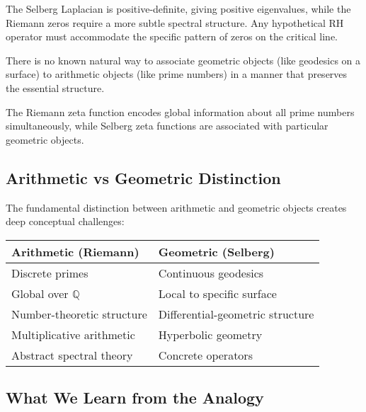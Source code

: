 \begin{problem}
\label{prob:sign_problem}
The Selberg Laplacian is positive-definite, giving positive eigenvalues, while the Riemann zeros require a more subtle spectral structure. Any hypothetical RH operator must accommodate the specific pattern of zeros on the critical line.
\end{problem}

\begin{problem}
\label{prob:arithmetic_geometric}
There is no known natural way to associate geometric objects (like geodesics on a surface) to arithmetic objects (like prime numbers) in a manner that preserves the essential structure.
\end{problem}

\begin{problem}
\label{prob:global_local}
The Riemann zeta function encodes global information about all prime numbers simultaneously, while Selberg zeta functions are associated with particular geometric objects.
\end{problem}

\subsection{Arithmetic vs Geometric Distinction}

The fundamental distinction between arithmetic and geometric objects creates deep conceptual challenges:

\begin{center}
\begin{tabular}{|l|l|}
\hline
\textbf{Arithmetic (Riemann)} & \textbf{Geometric (Selberg)} \\
\hline
Discrete primes & Continuous geodesics \\
Global over $\mathbb{Q}$ & Local to specific surface \\
Number-theoretic structure & Differential-geometric structure \\
Multiplicative arithmetic & Hyperbolic geometry \\
Abstract spectral theory & Concrete operators \\
\hline
\end{tabular}
\end{center}

\subsection{What We Learn from the Analogy}

